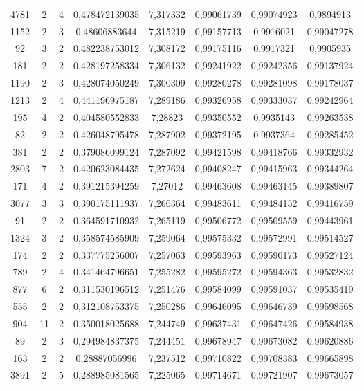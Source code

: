 \begin{longtable}{|c|c|c|c|c|c|c|c|}
4781 & 2 & 4 & 0,478472139035 & 7,317332 & 0,99061739 & 0,99074923 & 0,9894913 \\
1152 & 2 & 3 & 0,48606883644 & 7,315219 & 0,99157713 & 0,9916021 & 0,99047278 \\
92 & 3 & 2 & 0,482238753012 & 7,308172 & 0,99175116 & 0,9917321 & 0,9905935 \\
181 & 2 & 2 & 0,428197258334 & 7,306132 & 0,99241922 & 0,99242356 & 0,99137924 \\
1190 & 2 & 3 & 0,428074050249 & 7,300309 & 0,99280278 & 0,99281098 & 0,99178037 \\
1213 & 2 & 4 & 0,441196975187 & 7,289186 & 0,99326958 & 0,99333037 & 0,99242964 \\
195 & 4 & 2 & 0,404580552833 & 7,28823 & 0,99350552 & 0,9935143 & 0,99263538 \\
82 & 2 & 2 & 0,426048795478 & 7,287902 & 0,99372195 & 0,9937364 & 0,99285452 \\
381 & 2 & 2 & 0,379086099124 & 7,287092 & 0,99421598 & 0,99418766 & 0,99332932 \\
2803 & 7 & 2 & 0,420623084435 & 7,272624 & 0,99408247 & 0,99415963 & 0,99344264 \\
171 & 4 & 2 & 0,391215394259 & 7,27012 & 0,99463608 & 0,99463145 & 0,99389807 \\
3077 & 3 & 3 & 0,390175111937 & 7,266364 & 0,99483611 & 0,99484152 & 0,99416759 \\
91 & 2 & 2 & 0,364591710932 & 7,265119 & 0,99506772 & 0,99509559 & 0,99443961 \\
1324 & 3 & 2 & 0,358574585909 & 7,259064 & 0,99575332 & 0,99572991 & 0,99514527 \\
174 & 2 & 2 & 0,337775256007 & 7,257063 & 0,99593963 & 0,99590173 & 0,99527124 \\
789 & 2 & 4 & 0,341464796651 & 7,255282 & 0,99595272 & 0,99594363 & 0,99532832 \\
877 & 6 & 2 & 0,311530196512 & 7,251476 & 0,99584099 & 0,99591037 & 0,99535419 \\
555 & 2 & 2 & 0,312108753375 & 7,250286 & 0,99646095 & 0,99646739 & 0,99598568 \\
904 & 11 & 2 & 0,350018025688 & 7,244749 & 0,99637431 & 0,99647426 & 0,99584938 \\
89 & 2 & 3 & 0,294984837375 & 7,244451 & 0,99678947 & 0,99673082 & 0,99620886 \\
163 & 2 & 2 & 0,28887056996 & 7,237512 & 0,99710822 & 0,99708383 & 0,99665898 \\
3891 & 2 & 5 & 0,288985081565 & 7,225065 & 0,99714671 & 0,99721907 & 0,99673057 \\

\end{longtable}
